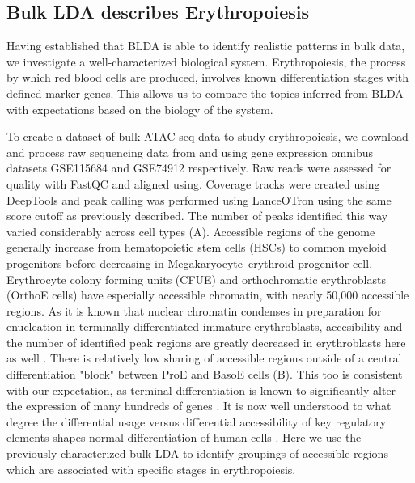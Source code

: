 \subsection{Bulk LDA describes Erythropoiesis}

Having established that BLDA is able to identify realistic patterns in bulk data, we investigate a well-characterized biological system. Erythropoiesis, the process by which red blood cells are produced, involves known differentiation stages with defined marker genes. This allows us to compare the topics inferred from BLDA with expectations based on the biology of the system.

To create a dataset of bulk ATAC-seq data to study erythropoiesis, we download and process raw sequencing data from \textcite{Ludwig2019} and \textcite{Corces2016} using gene expression omnibus datasets GSE115684 and GSE74912 respectively. Raw reads were assessed for quality with FastQC and aligned using. Coverage tracks were created using DeepTools and peak calling was performed using LanceOTron using the same score cutoff as previously described. The number of peaks identified this way varied considerably across cell types (A). Accessible regions of the genome generally increase from hematopoietic stem cells (HSCs) to common myeloid progenitors before decreasing in Megakaryocyte–erythroid progenitor cell. Erythrocyte colony forming units (CFUE) and orthochromatic erythroblasts (OrthoE cells) have especially accessible chromatin, with nearly 50,000 accessible regions. As it is known that nuclear chromatin condenses in preparation for enucleation in terminally differentiated immature erythroblasts, accesibility and the number of identified peak regions are greatly decreased in erythroblasts here as well \cite{Schulz2019}. There is relatively low sharing of accessible regions outside of a central differentiation "block" between ProE and BasoE cells (B). This too is consistent with our expectation, as terminal differentiation is known to significantly alter the expression of many hundreds of genes \cite{Schulz2019}. It is now well understood to what degree the differential usage versus differential accessibility of key regulatory elements shapes normal differentiation of human cells \cite{Song2011,West2014}. Here we use the previously characterized bulk LDA to identify groupings of accessible regions which are associated with specific stages in erythropoiesis. 


